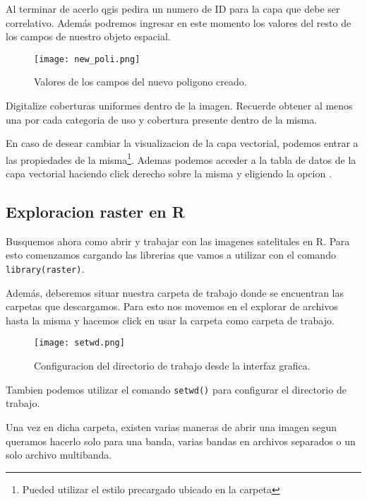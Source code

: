 Al terminar de acerlo qgis pedira un numero de ID para la capa que debe ser
correlativo. Además podremos ingresar en este momento los valores del resto de
los campos de nuestro objeto espacial.

\begin{figure}
\begin{center}
    \texttt{[image: new\_poli.png]}
\end{center}
    \caption{Valores de los campos del nuevo poligono creado.}
    \label{fig:newpoli}
\end{figure}

\begin{act}
   Digitalize coberturas uniformes dentro de la imagen. Recuerde obtener al
   menos una por cada categoria de uso y cobertura presente dentro de la misma.
\end{act}

En caso de desear cambiar la visualizacion de la capa vectorial, podemos entrar
a las propiedades de la misma\footnote{Pueded utilizar el estilo precargado
ubicado en la carpeta }. Ademas podemos acceder a la tabla de
datos de la capa vectorial haciendo click derecho sobre la misma y eligiendo la
opcion .

\subsection{Exploracion raster en R}
Busquemos ahora como abrir y trabajar con las imagenes satelitales en R. Para
esto comenzamos cargando las librerias que vamos a utilizar con el comando
\texttt{library(raster)}. 

Además, deberemos situar nuestra carpeta de trabajo donde se encuentran las
carpetas que descargamos. Para esto nos movemos en el explorar de archivos
hasta la misma y hacemos click en usar la carpeta como carpeta de trabajo.

\begin{figure}
\begin{center}
    \texttt{[image: setwd.png]}
\end{center}
\caption{Configuracion del directorio de trabajo desde la interfaz grafica.}
\label{fig:setwd}
\end{figure}

Tambien podemos utilizar el comando \texttt{setwd()} para configurar el
directorio de trabajo.

Una vez en dicha carpeta, existen varias maneras de abrir una imagen segun
queramos hacerlo solo para una banda, varias bandas en archivos separados o un
solo archivo multibanda.

